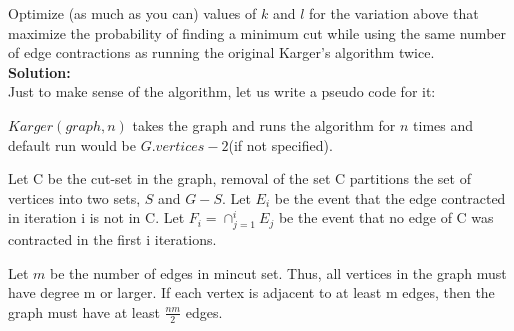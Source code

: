 \documentclass{article}
\begin{document}
\begin{enumerate}
    Optimize (as much as you can) values of $k$ and $l$ for the variation above that maximize the probability of finding a minimum cut while using the same number of edge contractions as running the original Karger's algorithm twice.\\
    \textbf{Solution:}\\
    Just to make sense of the algorithm, let us write a pseudo code for it:
    \begin{algorithmic}[1]
            \EndFor
        \EndFunction
    \end{algorithmic}
    $Karger(graph,n)$ takes the graph and runs the algorithm for $n$ times and default run would be $G.vertices-2$(if not specified).

    Let C be the cut-set in the graph, removal of the set C partitions the set of vertices into two sets, $S$ and $G-S$.
    Let $E_i$ be the event that the edge contracted in iteration i is not in C. Let $F_i=\cap_{j=1}^{i}E_j$ be the event that no edge of C was contracted in the first i iterations.

    Let $m$ be the number of edges in mincut set. Thus, all vertices in the graph must have degree m or larger. If each vertex is adjacent to at least m edges, then the graph must have at least $\frac{nm}{2}$ edges.


\end{enumerate}
\end{document}
